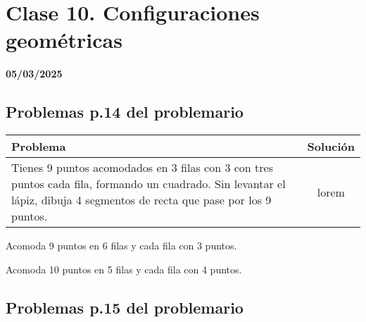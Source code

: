 \chapter{Clase 10. Configuraciones geométricas}
\textbf{05/03/2025}

\section{Problemas p.14 del problemario}

\begin{tabular}{l c}
    Problema & Solución \\\hline
    
    Tienes 9 puntos acomodados en 3 filas con 3 con tres puntos cada fila, formando un cuadrado. Sin levantar el lápiz, dibuja 4 segmentos de recta que pase por los 9 puntos. & lorem
\end{tabular}


\begin{excercise}
    Acomoda 9 puntos en 6 filas y cada fila con 3 puntos.
\end{excercise}

\begin{excercise}
    Acomoda 10 puntos en 5 filas y cada fila con 4 puntos.
\end{excercise}

\section{Problemas p.15 del problemario}
